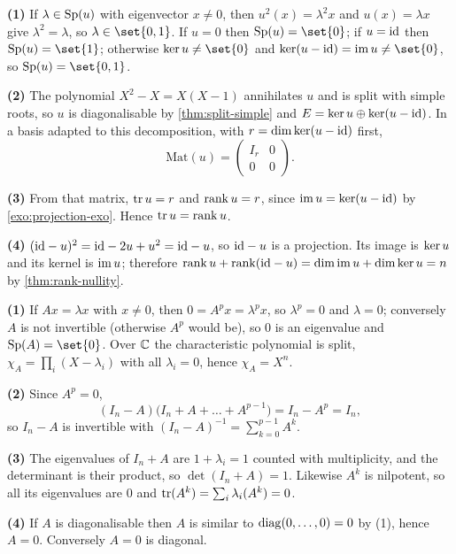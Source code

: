 \begin{solution}{}
\textbf{(1)} If $\lambda\in\operatorname{Sp}(u)$ with eigenvector $x\neq0$, then
$u^{2}(x)=\lambda^{2}x$ and $u(x)=\lambda x$ give $\lambda^{2}=\lambda$, so
$\lambda\in\set{0,1}$. If $u=0$ then $\spec(u)=\set{0}$; if $u=\mathrm{id}$ then
$\spec(u)=\set{1}$; otherwise $\Ker u\neq\set{0}$ and
$\Ker(u-\id)=\im u\neq\set{0}$, so $\spec(u)=\set{0,1}$.

\textbf{(2)} The polynomial $X^{2}-X=X(X-1)$ annihilates $u$ and is split with
simple roots, so $u$ is diagonalisable by \cref{thm:split-simple} and
$E=\operatorname{ker} u\oplus\operatorname{ker}(u-\mathrm{id})$. In a basis adapted to this decomposition, with
$r=\dim\operatorname{ker}(u-\mathrm{id})$ first,
\[
  \mathrm{Mat}(u)=\begin{pmatrix} I_r & 0\\ 0 & 0\end{pmatrix}.
\]

\textbf{(3)} From that matrix, $\operatorname{tr} u=r$ and $\operatorname{rank} u=r$, since
$\operatorname{im} u=\operatorname{ker}(u-\mathrm{id})$ by \cref{exo:projection-exo}. Hence $\operatorname{tr} u=\operatorname{rank} u$.

\textbf{(4)} $(\mathrm{id}-u)^{2}=\mathrm{id}-2u+u^{2}=\mathrm{id}-u$, so $\mathrm{id}-u$ is a projection. Its
image is $\operatorname{ker} u$ and its kernel is $\operatorname{im} u$; therefore
$\operatorname{rank} u+\operatorname{rank}(\mathrm{id}-u)=\dim\operatorname{im} u+\dim\operatorname{ker} u=n$ by \cref{thm:rank-nullity}.
\end{solution}

\begin{solution}{}
\textbf{(1)} If $Ax=\lambda x$ with $x\neq0$, then $0=A^{p}x=\lambda^{p}x$, so
$\lambda^{p}=0$ and $\lambda=0$; conversely $A$ is not invertible (otherwise
$A^{p}$ would be), so $0$ is an eigenvalue and $\spec(A)=\set{0}$. Over $\mathbb{C}$ the
characteristic polynomial is split, $\chi_A=\prod_{i}(X-\lambda_i)$ with all
$\lambda_i=0$, hence $\chi_A=X^{n}$.

\textbf{(2)} Since $A^{p}=0$,
\[
  (I_n-A)\bigl(I_n+A+\dots+A^{p-1}\bigr)=I_n-A^{p}=I_n,
\]
so $I_n-A$ is invertible with $(I_n-A)^{-1}=\sum_{k=0}^{p-1}A^{k}$.

\textbf{(3)} The eigenvalues of $I_n+A$ are $1+\lambda_i=1$ counted with
multiplicity, and the determinant is their product, so $\det(I_n+A)=1$. Likewise
$A^{k}$ is nilpotent, so all its eigenvalues are $0$ and
$\operatorname{tr}(A^{k})=\sum_i\lambda_i(A^{k})=0$.

\textbf{(4)} If $A$ is diagonalisable then $A$ is similar to $\operatorname{diag}(0,\dots,0)=0$
by (1), hence $A=0$. Conversely $A=0$ is diagonal.
\end{solution}


